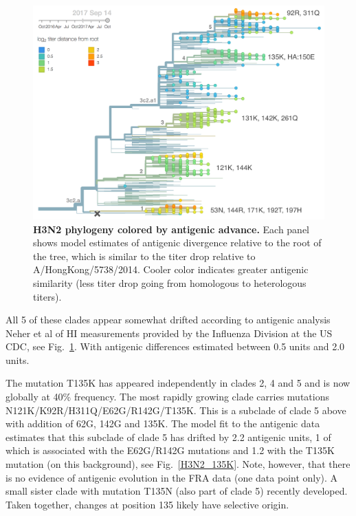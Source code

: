 \documentclass[11pt,oneside,letterpaper]{article}
\newcommand{\FIG}[1]{Fig.~\ref{#1}}
\begin{document}
\clearpage
\begin{figure}[h!]
  \centering
  \includegraphics[width=1.0\textwidth]{../figures/sep-2017/h3n2_tree_titer_model.png}
  \caption{\textbf{H3N2 phylogeny colored by antigenic advance.}
  Each panel shows model estimates of antigenic divergence relative to the root of the tree, which is similar to the titer drop relative to A/HongKong/5738/2014.
  Cooler color indicates greater antigenic similarity (less titer drop going from homologous to heterologous titers).
  }
  \label{H3N2_tree_titer_model}
\end{figure}


All 5 of these clades appear somewhat drifted according to antigenic
analysis Neher et al \cite{neher2015prediction} of HI measurements provided by the Influenza Division at the US CDC, see \FIG{H3N2_tree_titer_model}.
With antigenic differences estimated between 0.5 units and 2.0 units.


The mutation T135K has appeared independently in clades 2, 4 and 5 and is now globally at 40\% frequency.
The most rapidly growing clade carries mutations
N121K/K92R/H311Q/E62G/R142G/T135K. This is a subclade of clade 5 above
with addition of 62G, 142G and 135K. The model fit to the antigenic data
estimates that this subclade of clade 5 has drifted by 2.2 antigenic
units, 1 of which is associated with the E62G/R142G mutations and 1.2
with the T135K mutation (on this background), see \FIG{H3N2_135K}.
Note, however, that there
is no evidence of antigenic evolution in the FRA data (one data point
only). A small sister clade with mutation T135N (also part of clade 5)
recently developed. Taken together, changes at position 135 likely have
selective origin.
\end{document}

